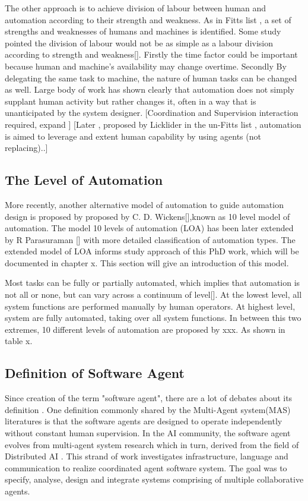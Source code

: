The other approach is to achieve division of labour between human and automation according to their strength and weakness. As in Fitts list \cite{Fitts} , a set of strengths and weaknesses of humans and machines is identified. Some study pointed the division of labour would not be as simple as a labour division according to strength and weakness[]. Firstly the time factor could be important because human and machine's availability may change overtime. Secondly By delegating the same task to machine, the nature of human tasks can be changed as well. Large body of work has shown clearly that automation does not simply supplant human activity but rather changes it, often in a way that is unanticipated by the system designer. [Coordination and Supervision interaction required, expand ] \cite{Bradshaw2011} [Later , proposed by Licklider in the un-Fitts list \cite{Hoffman2002}, automation is aimed to leverage and extent human capability by using agents (not replacing).\cite{Bradshaw2011}.] \\


\subsection{The Level of Automation}
More recently, another alternative model of automation to guide automation design is proposed by proposed by C. D. Wickens[],known as 10 level model of automation. The model 10 levels of automation (LOA) has been later extended by R Parasuraman [] with more detailed classification of automation types. The extended model of LOA informs study approach of this PhD work, which will be documented in chapter x. This section will give an introduction of this model. 


Most tasks can be fully or partially automated, which implies that automation is not all or none, but can vary across a continuum of level[]. At the lowest level, all system functions are performed manually by human operators.  At highest level, system are fully automated, taking over all system functions. In between this two extremes, 10 different levels of automation are proposed by xxx. As shown in table x. 


\subsection{ Definition of Software Agent }

Since creation of the term "software agent", there are a lot of debates about its definition . One definition commonly shared by the Multi-Agent system(MAS) literatures is that the software agents are designed to operate independently without constant human supervision. In the AI community, the software agent evolves from multi-agent system research which in turn, derived from the field of Distributed AI \cite{Vlassis2007}. This strand of work investigates infrastructure, language and communication to realize coordinated agent software system. The goal was to specify, analyse, design and integrate systems comprising of multiple collaborative agents.\cite{Nwana1996} \\

